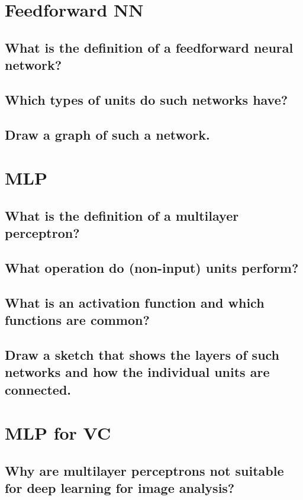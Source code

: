 \section{Feedforward NN}

\subsection{What is the definition of a feedforward neural network?}

\subsection{Which types of units do such networks have?}

\subsection{Draw a graph of such a network.}

\section{MLP}

\subsection{What is the definition of a multilayer perceptron?}

\subsection{What operation do (non-input) units perform?}

\subsection{What is an activation function and which functions are common?}

\subsection{Draw a sketch that shows the layers of such networks and how the individual units are connected.}

\section{MLP for VC}

\subsection{Why are multilayer perceptrons not suitable for deep learning for image analysis?}

